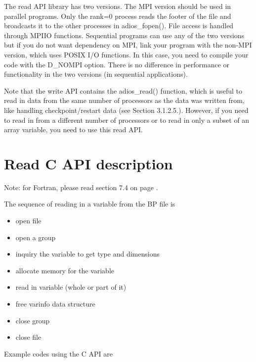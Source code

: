 The read API library has two versions. The MPI version should be used in parallel 
programs. Only the rank=0 process reads the footer of the file and broadcasts it 
to the other processes in adios\_fopen(). File access is handled through MPI\-{}IO 
functions. Sequential programs can use any of the two versions but if you do not 
want dependency on MPI, link your program with the non-MPI version, which uses 
POSIX I/O functions. In this case, you need to compile your code with the \-{}D\_NOMPI 
option. There is no difference in performance or functionality in the two versions 
(in sequential applications). 

Note that the write API contains the adios\_read() function, which is useful to 
read in data from the same number of processors as the data was written from, like 
handling checkpoint/restart data (see Section 3.1.2.5.). However, if you need to 
read in from a different number of processors or to read in only a subset of an 
array variable, you need to use this read API.\label{HToc182553398}

\section{Read C API description}

Note: for Fortran, please read section 7.4 on page \pageref{HRef144348801}.

The sequence of reading in a variable from the BP file is

\begin{itemize}
\renewcommand{\labelitemi}{$-$}
\item open file

\item open a group

\item inquiry the variable to get type and dimensions

\item allocate memory for the variable

\item read in variable (whole or part of it)

\item free varinfo data structure

\item close group

\item close file
\end{itemize}

Example codes using the C API are 

